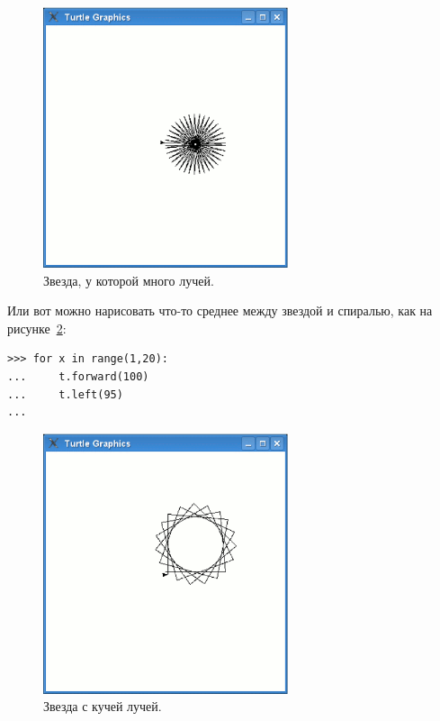 \begin{figure}
\begin{center}
\includegraphics[width=72mm]{../en/figure21.eps}
\end{center}
\caption{Звезда, у которой много лучей.}\label{fig21}
\end{figure}

Или вот можно нарисовать что-то среднее между звездой и спиралью, как на рисунке \ref{fig22}:

\begin{listing}
\begin{verbatim}
>>> for x in range(1,20):
...     t.forward(100)
...     t.left(95)
...
\end{verbatim}
\end{listing}

\begin{figure}
\begin{center}
\includegraphics[width=72mm]{../en/figure22.eps}
\end{center}
\caption{Звезда с кучей лучей.}\label{fig22}
\end{figure}

